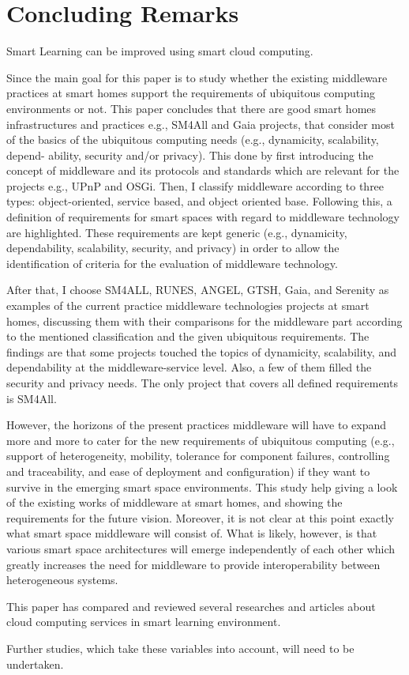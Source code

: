 \documentclass[journal]{vgtc}                %
\begin{document}
\section{Concluding Remarks}
Smart Learning can be improved using smart cloud computing.

Since the main goal for this paper is to study whether the existing middleware practices at smart homes support the requirements of ubiquitous computing environments or not. This paper concludes that there are good smart homes infrastructures and practices e.g., SM4All and Gaia projects, that consider most of the basics of the ubiquitous computing needs (e.g., dynamicity, scalability, depend- ability, security and/or privacy). This done by first introducing the concept of middleware and its protocols and standards which are relevant for the projects e.g., UPnP and OSGi. Then, I classify middleware according to three types: object-oriented, service based, and object oriented base. Following this, a definition of requirements for smart spaces with regard to middleware technology are highlighted. These requirements are kept generic (e.g., dynamicity, dependability, scalability, security, and privacy) in order to allow the identification of criteria for the evaluation of middleware technology.

After that, I choose SM4ALL, RUNES, ANGEL, GTSH, Gaia, and Serenity as examples of the current practice middleware technologies projects at smart homes, discussing them with their comparisons for the middleware part according to the mentioned classification and the given ubiquitous requirements. The findings are that some projects touched the topics of dynamicity, scalability, and dependability at the middleware-service level. Also, a few of them filled the security and privacy needs. The only project that covers all defined requirements is SM4All.

However, the horizons of the present practices middleware will have to expand more and more to cater for the new requirements of ubiquitous computing (e.g., support of heterogeneity, mobility, tolerance for component failures, controlling and traceability, and ease of deployment and configuration) if they want to survive in the emerging smart space environments. This study help giving a look of the existing works of middleware at smart homes, and showing the requirements for the future vision. Moreover, it is not clear at this point exactly what smart space middleware will consist of. What is likely, however, is that various smart space architectures will emerge independently of each other which greatly increases the need for middleware to provide interoperability between heterogeneous systems.

This paper has compared and reviewed several researches and articles about cloud computing services in smart learning environment.

Further studies, which take these variables into account, will need to be undertaken.




\end{document}
